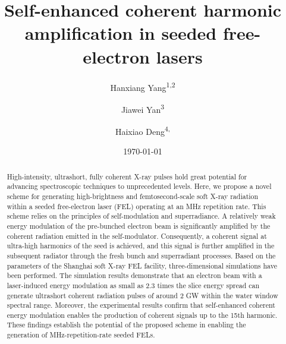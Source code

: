 \documentclass[%
 reprint,
 amsmath,amssymb,
 aps,
]{revtex4-2}
\begin{document}

\title{Self-enhanced coherent harmonic amplification in seeded free-electron lasers}%

\author{Hanxiang Yang\textsuperscript{1,}\textsuperscript{2}}
\author{Jiawei Yan\textsuperscript{3}}
\author{Haixiao Deng\textsuperscript{4,}}%
%

\date{\today}%

\begin{abstract}
High-intensity, ultrashort, fully coherent X-ray pulses hold great potential for advancing spectroscopic techniques to unprecedented levels. Here, we propose a novel scheme for generating high-brightness and femtosecond-scale soft X-ray radiation within a seeded free-electron laser (FEL) operating at an MHz repetition rate. This scheme relies on the principles of self-modulation and superradiance. A relatively weak energy modulation of the pre-bunched electron beam is significantly amplified by the coherent radiation emitted in the self-modulator. Consequently, a coherent signal at ultra-high harmonics of the seed is achieved, and this signal is further amplified in the subsequent radiator through the fresh bunch and superradiant processes. Based on the parameters of the Shanghai soft X-ray FEL facility, three-dimensional simulations have been performed. The simulation results demonstrate that an electron beam with a laser-induced energy modulation as small as 2.3 times the slice energy spread can generate ultrashort coherent radiation pulses of around 2 GW within the water window spectral range. Moreover, the experimental results confirm that self-enhanced coherent energy modulation enables the production of coherent signals up to the 15th harmonic. These findings establish the potential of the proposed scheme in enabling the generation of MHz-repetition-rate seeded FELs.
\end{abstract}
\end{document}
